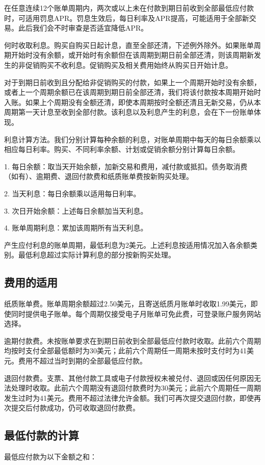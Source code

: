 \documentclass[UTF8,fontset=none,11pt,a4paper]{ctexart}
\begin{document}
在任意连续12个账单周期内，两次或以上未在付款到期日前收到全部最低应付款时，可适用罚息APR。罚息生效后，每日利率及APR提高，可能适用于全部新交易。此后我们会不时审查是否适宜降低APR。


何时收取利息。购买自购买日起计息，直至全部还清，下述例外除外。如果账单周期开始时没有余额，或开始时有余额但在该周期到期日前全部还清，则该周期新发生的非促销购买不收利息。促销购买及相关费用始终从购买日开始计息。


对于到期日前收到且分配给非促销购买的付款，如果上一个周期开始时没有余额，或者上一个周期余额已在该周期到期日前全部还清，我们将该付款按本周期开始时入账。如果上个周期没有全额还清，即使本周期按时全额还清且无新交易，仍从本周期第一天计息至收到全部付款。该利息以及利息产生的利息，会在下一份账单体现。


利息计算方法。我们分别计算每种余额的利息，对账单周期中每天的每日余额乘以相应每日利率。购买、不同利率余额、计划或促销余额分别计算每日余额。


1. 每日余额：取当天开始余额，加新交易和费用，减付款或抵扣。债务取消费（如有）、逾期费、退回付款费和纸质账单费按新购买处理。


2. 当天利息：每日余额乘以适用每日利率。


3. 次日开始余额：上述每日余额加当天利息。


4. 账单周期利息：累加该周期所有当天利息。


产生应付利息的账单周期，最低利息为2美元。上述利息按适用情况加入各余额类别。最低利息超过实际计算利息的部分按新购买处理。


\subsection*{费用的适用}
纸质账单费。账单周期余额超过2.50美元，且寄送纸质月账单时收取1.99美元，即使同时提供电子账单。每个周期仅接受电子月账单可免此费，可登录账户服务网站选择。


逾期付款费。未按账单要求在到期日前收到全部最低应付款时收取。此前六个周期均按时支付全部最低额时为30美元；此前六个周期任一周期未按时支付时为41美元。费用不超过当时到期的全部最低应付款。


退回付款费。支票、其他付款工具或电子付款授权未被兑付、退回或因任何原因无法处理时收取。此前六个周期没有退回付款费时为30美元；此前六个周期任一周期发生过时为41美元。费用不超过法律允许金额。我们可再次提交退回付款，即使再次提交后付款成功，仍可收取退回付款费。


\subsection*{最低付款的计算}
最低应付款为以下金额之和：
\end{document}
